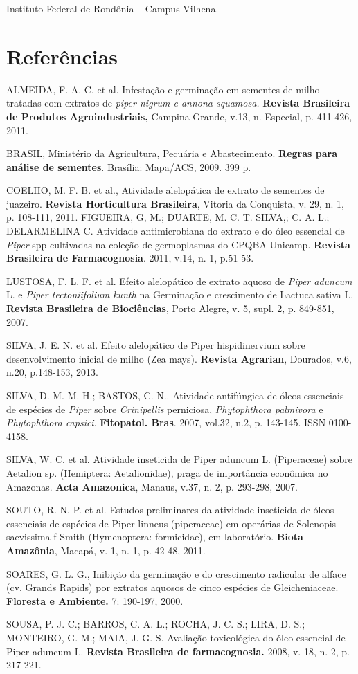 \documentclass[article,12pt,onesidea,4paper,english,brazil]{abntex2}
\begin{document}
	Instituto Federal de Rondônia – Campus Vilhena.
	
	\section*{Referências}
	
	\noindent ALMEIDA, F. A. C. et al. Infestação e germinação em sementes de milho tratadas com extratos de \textit{piper nigrum e annona squamosa.} \textbf{Revista Brasileira de Produtos Agroindustriais,} Campina Grande, v.13, n. Especial, p. 411-426, 2011.
	
	\noindent BRASIL, Ministério da Agricultura, Pecuária e Abastecimento. \textbf{Regras para análise de sementes}. Brasília: Mapa/ACS, 2009. 399 p.
	
	\noindent COELHO, M. F. B. et al., Atividade alelopática de extrato de sementes de juazeiro. \textbf{Revista Horticultura Brasileira}, Vitoria da Conquista, v. 29, n. 1, p. 108-111, 2011. FIGUEIRA, G, M.; DUARTE, M. C. T. SILVA,; C. A. L.; DELARMELINA C. Atividade antimicrobiana do extrato e do óleo essencial de \textit{Piper} spp cultivadas na coleção de germoplasmas do CPQBA-Unicamp. \textbf{Revista Brasileira de Farmacognosia}. 2011, v.14, n. 1, p.51-53.
	
	\noindent LUSTOSA, F. L. F. et al. Efeito alelopático de extrato aquoso de \textit{Piper aduncum} L. e \textit{Piper tectoniifolium kunth} na Germinação e crescimento de Lactuca sativa L. \textbf{Revista Brasileira de Biociências}, Porto Alegre, v. 5, supl. 2, p. 849-851, 2007.
	
	\noindent SILVA, J. E. N. et al. Efeito alelopático de Piper hispidinervium sobre desenvolvimento inicial de milho (Zea mays). \textbf{Revista Agrarian}, Dourados, v.6, n.20, p.148-153, 2013.
	
	\noindent SILVA, D. M. M. H.; BASTOS, C. N.. Atividade antifúngica de óleos essenciais de espécies de \textit{Piper} sobre \textit{Crinipellis} perniciosa, \textit{Phytophthora palmivora} e \textit{Phytophthora capsici}. \textbf{Fitopatol. Bras}. 2007, vol.32, n.2, p. 143-145. ISSN 0100- 4158.
	
	\noindent SILVA, W. C. et al. Atividade inseticida de Piper aduncum L. (Piperaceae) sobre Aetalion sp. (Hemiptera: Aetalionidae), praga de importância econômica no Amazonas. \textbf{Acta Amazonica}, Manaus, v.37, n. 2, p. 293-298, 2007.
	
	\noindent SOUTO, R. N. P. et al. Estudos preliminares da atividade inseticida de óleos essenciais de espécies de Piper linneus (piperaceae) em operárias de Solenopis saevissima f Smith (Hymenoptera: formicidae), em laboratório. \textbf{Biota Amazônia}, Macapá, v. 1, n. 1, p. 42-48, 2011.
	
	\noindent SOARES, G. L. G., Inibição da germinação e do crescimento radicular de alface (cv. Grands Rapids) por extratos aquosos de cinco espécies de Gleicheniaceae. \textbf{Floresta e Ambiente.} 7: 190-197, 2000.
	
	\noindent SOUSA, P. J. C.; BARROS, C. A. L.; ROCHA, J. C. S.; LIRA, D. S.; MONTEIRO, G.
	M.; MAIA, J. G. S. Avaliação toxicológica do óleo essencial de Piper aduncum L.
	\textbf{Revista Brasileira de farmacognosia.} 2008, v. 18, n. 2, p. 217-221.
	
\end{document}

